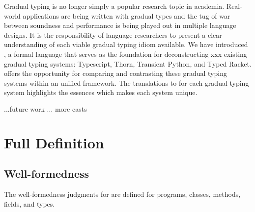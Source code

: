 \documentclass[acmlarge, anonymous, authordraft, review]{acmart} %
\begin{document}
Gradual typing is no longer simply a popular research topic in academia.
Real-world applications are being written with gradual types and the tug of
war between soundness and performance is being played out in multiple
language designs.  It is the responsibility of language researchers to
present a clear understanding of each viable gradual typing idiom available.
We have introduced \kafka, a formal language that serves as the foundation
for deconstructing xxx existing gradual typing systems: Typescript, Thorn,
Transient Python, and Typed Racket.
\kafka offers the
opportunity for comparing and contrasting these gradual typing systems
within an unified framework. The translations to \kafka for each gradual
typing system highlights the essences which makes each system unique.

...future work ... more casts




\clearpage

\appendix
\section{Full \kafka Definition}%
\label{appendix:kafka}

\subsection{Well-formedness}

The well-formedness judgments for \kafka are defined for programs, classes, methods, fields, and types.

\vspace{-1cm}
\end{document}
